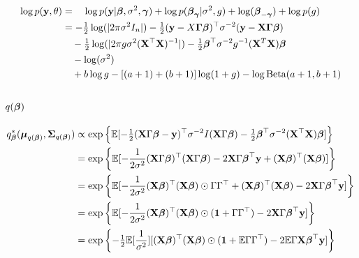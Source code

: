 \documentclass{amsart}[12pt]
\theoremstyle{definition}
\begin{document}
\begin{align*}
	\log p({\bf y}, \theta) & = \quad\log p({\bf y}|{\boldsymbol \beta}, \sigma^2, {\boldsymbol \gamma}) + \log p({\boldsymbol \beta}_{\boldsymbol \gamma} | \sigma^2, g) + \log({\boldsymbol \beta}_{-{\boldsymbol \gamma}}) + \log p(g) \\
	                    & = -\tfrac{1}{2} \log(|2 \pi \sigma^2 I_n|) - \tfrac{1}{2} ({\bf y} - X {\boldsymbol \Gamma} {\boldsymbol \beta})^\top \sigma^{-2} ({\bf y} - {\bf X} {\boldsymbol \Gamma} {\boldsymbol \beta})          \\
	                    & \quad -\tfrac{1}{2} \log(|2 \pi g \sigma^2 ({\bf X}^\top {\bf X})^{-1}|) -\tfrac{1}{2} {\boldsymbol \beta}^\top \sigma^{-2} g^{-1} ({\bf X}^T {\bf X}) {\boldsymbol \beta}        \\
	                    & \quad - \log (\sigma^2)                                                                                                   \\
	                    & \quad + b \log g - [(a + 1) + (b + 1)] \log (1 + g) - \log \text{Beta}(a + 1, b + 1)                                            
\end{align*}

\subsection{$q({\boldsymbol \beta})$}
\begin{align*}
	q_{\boldsymbol \beta}^*({\boldsymbol \mu}_{q({\boldsymbol \beta})}, {\boldsymbol \Sigma}_{q({\boldsymbol \beta})}) & \propto \exp \left\{ \mathbb{E}[-\tfrac{1}{2} ({\bf X} \Gamma {\boldsymbol\beta} - {\bf y})^\top \sigma^{-2} I ({\bf X} \Gamma {\boldsymbol\beta}) - \tfrac{1}{2} {\boldsymbol \beta}^\top \sigma^{-2} ({\bf X}^\top {\bf X}) {\boldsymbol \beta}] \right\}           \\
	                                                  & = \exp \left\{ \mathbb{E}[-\frac{1}{2 \sigma^2} ({\bf X} \Gamma {\boldsymbol\beta})^\top ({\bf X} \Gamma {\boldsymbol\beta}) - 2 {\bf X} \Gamma {\boldsymbol\beta}^\top {\bf y} + ({\bf X} {\boldsymbol \beta})^\top ({\bf X} {\boldsymbol \beta})] \right\}            \\
	                                                  & = \exp \left\{ \mathbb{E}[-\frac{1}{2 \sigma^2} ({\bf X} {\boldsymbol \beta})^\top ({\bf X} {\boldsymbol \beta}) \odot \Gamma \Gamma^\top + ({\bf X} {\boldsymbol \beta})^\top ({\bf X} {\boldsymbol \beta}) - 2 {\bf X} \Gamma {\boldsymbol\beta}^\top {\bf y}] \right\} \\
	                                                  & = \exp \left\{ \mathbb{E}[-\frac{1}{2 \sigma^2} ({\bf X} {\boldsymbol \beta})^\top ({\bf X} {\boldsymbol \beta}) \odot ({\bf 1} + \Gamma \Gamma^\top) - 2 {\bf X} \Gamma {\boldsymbol\beta}^\top {\bf y}] \right\}                        \\
	                                                  & = \exp \left\{ -\tfrac{1}{2} \mathbb{E}[\frac{1}{\sigma^2}] [({\bf X} {\boldsymbol \beta})^\top ({\bf X} {\boldsymbol \beta}) \odot ({\bf 1} + \mathbb{E} \Gamma \Gamma^\top) - 2 \mathbb{E} \Gamma {\bf X} {\boldsymbol\beta}^\top {\bf y}] \right\}            
\end{align*}
\end{document}
